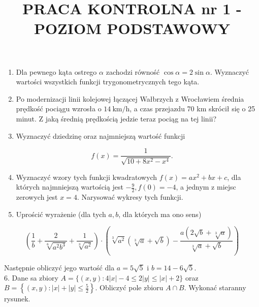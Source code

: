 \documentclass[10pt]{article}
\title{PRACA KONTROLNA nr 1 - POZIOM PODSTAWOWY }
\author{}
\date{}
\begin{document}
\maketitle
\begin{enumerate}
  \item Dla pewnego kąta ostrego $\alpha$ zachodzi równość $\cos \alpha=2 \sin \alpha$. Wyznaczyć wartości wszystkich funkcji trygonometrycznych tego kąta.
  \item Po modernizacji linii kolejowej łączącej Wałbrzych z Wrocławiem średnia prędkość pociągu wzrosła o $14 \mathrm{~km} / \mathrm{h}$, a czas przejazdu 70 km skrócił się o 25 minut. Z jaką średnią prędkością jedzie teraz pociąg na tej linii?
  \item Wyznaczyć dziedzinę oraz najmniejszą wartość funkcji
\end{enumerate}

$$
f(x)=\frac{1}{\sqrt{10+8 x^{2}-x^{4}}} .
$$

\begin{enumerate}
  \setcounter{enumi}{3}
  \item Wyznaczyć wzory tych funkcji kwadratowych $f(x)=a x^{2}+b x+c$, dla których najmniejszą wartością jest $-\frac{9}{2}, f(0)=-4$, a jednym z miejsc zerowych jest $x=4$. Narysować wykresy tych funkcji.
  \item Uprościć wyrażenie (dla tych $a, b$, dla których ma ono sens)
\end{enumerate}

$$
\left(\frac{1}{b}+\frac{2}{\sqrt[6]{a^{2} b^{3}}}+\frac{1}{\sqrt[3]{a^{2}}}\right) \cdot\left(\sqrt[3]{a^{2}}(\sqrt[3]{a}+\sqrt{b})-\frac{a(2 \sqrt{b}+\sqrt[3]{a})}{\sqrt[3]{a}+\sqrt{b}}\right)
$$

Następnie obliczyć jego wartość dla $a=5 \sqrt{5}$ i $b=14-6 \sqrt{5}$.\\
6. Dane sa zbiory $A=\{(x, y): 4|x|-4 \leqslant 2|y| \leqslant|x|+2\}$ oraz $B=\left\{(x, y):|x|+|y| \leqslant \frac{5}{2}\right\}$. Obliczyć pole zbioru $A \cap B$. Wykonać staranny rysunek.
\end{document}

